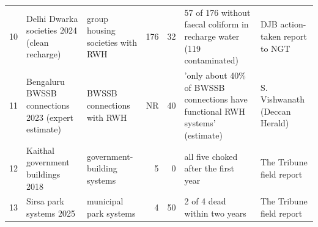 {\begin{longtable}{l p{2.8cm} p{2.6cm} r r p{4.6cm} p{2.9cm}}
10 & Delhi Dwarka societies 2024 (clean recharge) & group housing societies with RWH & 176 & 32 & 57 of 176 without faecal coliform in recharge water (119 contaminated) & DJB action-taken report to NGT\\
11 & Bengaluru BWSSB connections 2023 (expert estimate) & BWSSB connections with RWH & NR & 40 & 'only about 40\% of BWSSB connections have functional RWH systems' (estimate) & S. Vishwanath (Deccan Herald)\\
12 & Kaithal government buildings 2018 & government-building systems & 5 & 0 & all five choked after the first year & The Tribune field report\\
13 & Sirsa park systems 2025 & municipal park systems & 4 & 50 & 2 of 4 dead within two years & The Tribune field report\\
\end{longtable}}
